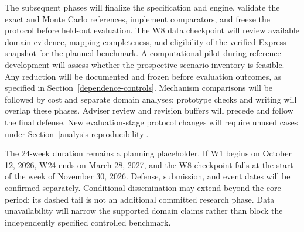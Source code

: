 The subsequent phases will finalize the specification and engine, validate
the exact and Monte Carlo references, implement comparators, and freeze the
protocol before held-out evaluation. The W8 data checkpoint will review
available domain evidence, mapping completeness, and eligibility of the
verified Express snapshot for the planned benchmark. A
computational pilot during reference development will assess whether the
prospective scenario inventory is feasible. Any reduction will be documented
and frozen before evaluation outcomes, as specified in
Section~\ref{dependence-controls}. Mechanism comparisons will be followed by
cost and separate domain analyses; prototype checks and writing will overlap
these phases. Adviser review and revision buffers will precede and follow the
final defense. New evaluation-stage protocol changes will require unused
cases under Section~\ref{analysis-reproducibility}.

The 24-week duration remains a planning placeholder. If W1 begins on
October 12, 2026, W24 ends on March 28, 2027, and the W8 checkpoint falls
at the start of the week of November 30, 2026. Defense, submission, and event
dates will be confirmed separately. Conditional dissemination may extend
beyond the core period; its dashed tail is not an additional committed
research phase. Data unavailability will narrow the supported domain claims
rather than block the independently specified controlled benchmark.


